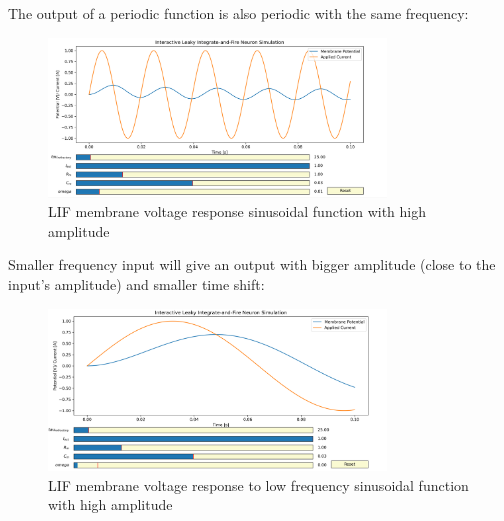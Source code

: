 The output of a periodic function is also periodic with the same frequency:

\begin{figure}[H]
    \centering
    \includegraphics[width=0.8\textwidth]{scientific-background/computational-models/LIF/graphs/LIF-med-freq-sin-response.png}
    \caption{LIF membrane voltage response sinusoidal function with high amplitude}
    \label{fig:LIF-med-freq-sin}
\end{figure}

Smaller frequency input will give an output with bigger amplitude (close to the input’s amplitude) and smaller time shift:

\begin{figure}[H]
    \centering
    \includegraphics[width=0.8\textwidth]{scientific-background/computational-models/LIF/graphs/LIF-low-freq-sin-response.png}
    \caption{LIF membrane voltage response to low frequency sinusoidal function with high amplitude}
    \label{fig:LIF-low-freq-sin}
\end{figure}